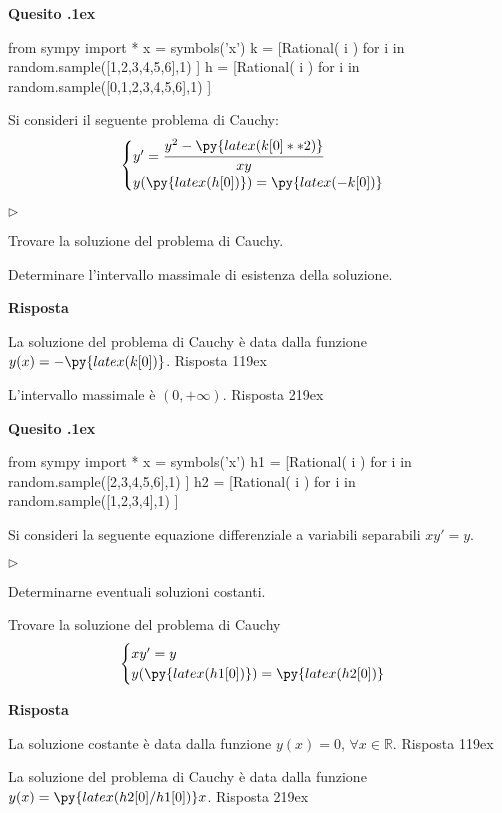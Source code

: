 \documentclass[11pt,twoside,a4paper]{article}
\newcommand{\mylabel}[1]{#1\hfill}
\renewenvironment{itemize}
  {\begin{list}{$\triangleright$}{%
   \setlength{\parskip}{0mm}
   \setlength{\topsep}{.4\baselineskip}
   \setlength{\rightmargin}{0mm}
   \setlength{\listparindent}{0mm}
   \setlength{\itemindent}{0mm}
   \setlength{\labelwidth}{2ex}
   \setlength{\itemsep}{.4\baselineskip}
   \setlength{\parsep}{0mm}
   \setlength{\partopsep}{0mm}
   \setlength{\labelsep}{1ex}
   \setlength{\leftmargin}{\labelwidth+\labelsep}
   \let\makelabel\mylabel}}{%
   \end{list}\vspace*{-1.3mm}}
\newcounter{quesito}
\newenvironment{question}{\bigskip\addtocounter{quesito}{1}\bigskip\bigskip\par\textbf{Quesito \thequesito.\kern1ex}}{\vspace{\parskip}}
\newenvironment{answer}{\par\textbf{Risposta\quad}}{\vspace{\parskip}}
\begin{document}
\begin{question}
\def\RR{{\mathds R}}
\begin{pycode}
from sympy import *
x = symbols('x')
k = [Rational( i ) for i in random.sample([1,2,3,4,5,6],1) ]
h = [Rational( i ) for i in random.sample([0,1,2,3,4,5,6],1) ]
\end{pycode}
Si consideri il seguente problema di Cauchy:
\[\begin{cases} y' = \cfrac{y^2 - \py{latex(k[0]**2)}}{xy} \cr y(\py{latex(h[0])}) = \py{latex(-k[0])} \end{cases}\]
\begin{itemize}
\item[1.] Trovare la soluzione del problema di Cauchy.
\item[2.] Determinare l'intervallo massimale di esistenza della soluzione.

\end{itemize}
\begin{answer}

{\color{blue}
La soluzione del problema di Cauchy \`e data dalla funzione $y(x) = -\py{latex(k[0])}$.
\hfill Risposta 1\kern19ex}

\smallskip
{\color{blue} L'intervallo massimale \`e $(0, +\infty)$.
\hfill Risposta 2\kern19ex}

\end{answer}
\end{question}
\begin{question}
\def\RR{{\mathds R}}
\begin{pycode}
from sympy import *
x = symbols('x')
h1 = [Rational( i ) for i in random.sample([2,3,4,5,6],1) ]
h2 = [Rational( i ) for i in random.sample([1,2,3,4],1) ]
\end{pycode}
Si consideri la seguente equazione differenziale a variabili separabili \(xy' = y\).
\begin{itemize}
\item[1.] Determinarne eventuali soluzioni costanti.
\item[2.] Trovare la soluzione del problema di Cauchy
\[\begin{cases} xy' = y \cr y(\py{latex(h1[0])}) = \py{latex(h2[0])}  \end{cases}\]
\end{itemize}
\begin{answer}

{\color{blue}
La soluzione costante \`e data dalla funzione $y(x) = 0$, $\forall x \in \RR$.
\hfill Risposta 1\kern19ex}

\smallskip
{\color{blue} La soluzione del problema di Cauchy \`e data dalla funzione $y(x) = \py{latex(h2[0]/h1[0])}x$.
\hfill Risposta 2\kern19ex}

\end{answer}
\end{question}
\end{document}
